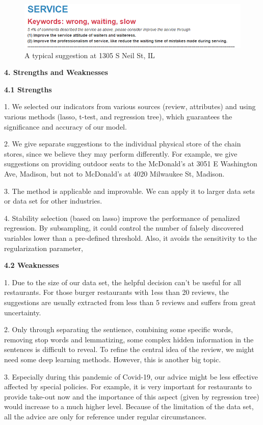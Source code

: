 \documentclass[12pt]{article}
\begin{document}
	\begin{figure}[htbp]
		\centering
		\includegraphics[width=15cm]{typical.png}
		\caption{A typical suggestion at 1305 S Neil St, IL}
		\label{fig:ins}
	\end{figure}
	
	\noindent\textbf{4. Strengths and Weaknesses}
	
	\noindent\textbf{4.1 Strengths}
	
	1. We selected our indicators from various sources (review, attributes) and using various methods (lasso, t-test, and regression tree), which guarantees the significance and accuracy of our model.
	
	2. We give separate suggestions to the individual physical store of the chain stores, since we believe they may perform differently. For example, we give suggestions on providing outdoor seats to the McDonald's at 3051 E Washington Ave, Madison, but not to McDonald's at 4020 Milwaukee St, Madison.
	
	3. The method is applicable and improvable. We can apply it to larger data sets or data set for other industries.
	
	4. Stability selection (based on lasso) improve the performance of penalized regression. By subsampling, it could control the number of falsely discovered variables lower than a pre-defined threshold. Also, it avoids the sensitivity to the regularization parameter,
	
	
	\noindent\textbf{4.2 Weaknesses}
	
	1. Due to the size of our data set, the helpful decision can't be useful for all restaurants. For those burger restaurants with 1ess than 20 reviews, the suggestions are usually extracted from less than 5 reviews and suffers from great uncertainty.
	
	2. Only through separating the sentience, combining some specific words, removing stop words and lemmatizing, some complex hidden information in the sentences is difficult to reveal. To refine the central idea of the review, we might need some deep learning methods. However, this is another big topic.
	
	3. Especially during this pandemic of Covid-19, our advice might be less effective affected by special policies. For example, it is very important for restaurants to provide take-out now and the importance of this aspect (given by regression tree) would increase to a much higher level. Because of the limitation of the data set, all the advice are only for reference under regular circumstances.
	
\end{document}
